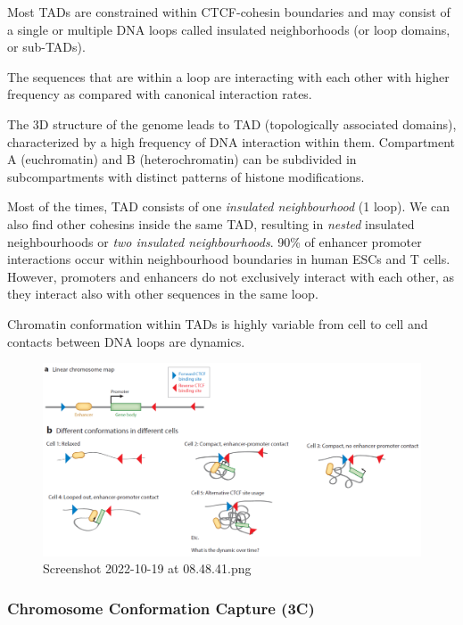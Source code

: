 Most TADs are constrained within CTCF-cohesin boundaries and may consist of a single or multiple DNA loops called insulated neighborhoods (or loop domains, or sub-TADs).


The sequences that are within a loop are interacting with each other with higher frequency as compared with canonical interaction rates.

The 3D structure of the genome leads to TAD (topologically associated domains), characterized by a high frequency of DNA interaction within them. Compartment A (euchromatin) and B (heterochromatin) can be subdivided in subcompartments with distinct patterns of histone modifications.

Most of the times, TAD consists of one \emph{insulated neighbourhood} (1 loop). We can also find other cohesins inside the same TAD, resulting in \emph{nested} insulated neighbourhoods or \emph{two insulated neighbourhoods}. 90\% of enhancer promoter interactions occur within neighbourhood boundaries in human ESCs and T cells. However, promoters and enhancers do not exclusively interact with each other, as they interact also with other sequences in the same loop.

Chromatin conformation within TADs is highly variable from cell to cell and contacts between DNA loops are dynamics.

\begin{figure}
\centering
\includegraphics[width=\textwidth]{../_resources/Screenshot_2022-10-19_at_08-48-41.png}
\caption{Screenshot 2022-10-19 at 08.48.41.png}
\end{figure}

\hypertarget{chromosome-conformation-capture-3c}{%
\subsubsection{Chromosome Conformation Capture (3C)}\label{chromosome-conformation-capture-3c}}

